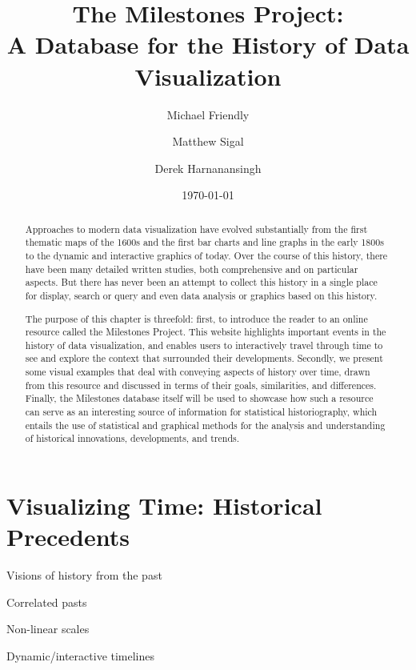 \documentclass[11pt]{article}
\begin{document}
\title{The Milestones Project: \\ A Database for the History of Data Visualization}
\author{Michael Friendly \and Matthew Sigal \and Derek Harnanansingh}
\date{\today}

\maketitle

\begin{abstract}
Approaches to modern data visualization have evolved substantially from the first thematic maps of the 1600s and the
first bar charts and line graphs
in the early 1800s to the dynamic and interactive graphics of today.
Over the course of this history, there have been many detailed written studies, both comprehensive
and on particular aspects. But there has never been an attempt to collect this history 
in a single place for display, search or query and even data analysis or graphics based on this history.

The purpose of this chapter is threefold: first, to introduce the reader to an online resource called the Milestones Project. 
This website highlights important events in the history of data visualization, and enables users to interactively travel through time to see and explore
the context that surrounded their developments. Secondly, we present some visual
examples that
deal with conveying aspects of history
over time, drawn from this resource and discussed in terms of their goals, similarities, and differences.
Finally, the Milestones database itself will be used to showcase how such a resource can serve as an interesting source of information for statistical historiography, which entails the use of statistical and graphical methods for the analysis and understanding of historical innovations, developments, and trends.
\end{abstract}





\section{Visualizing Time: Historical Precedents}\label{sec:vistime}
\begin{itemize*}
  \item Visions of history from the past
  \item Correlated pasts
  \item Non-linear scales
  \item Dynamic/interactive timelines
\end{itemize*}
\end{document}
